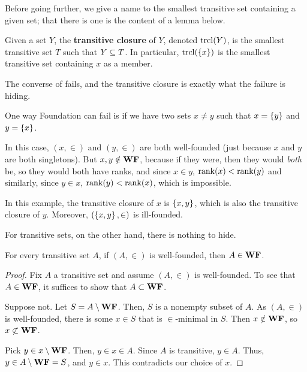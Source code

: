 Before going further, we give a name to the smallest transitive set containing a given set; that there is one is the content of a lemma below.

\begin{boxdefinition}
    Given a set $Y$, the \textbf{transitive closure} of $Y$, denoted $\operatorname{trcl}\!\left( Y \right)$, is the smallest transitive set $T$ such that $Y \subseteq T$. In particular, $\operatorname{trcl}\!\left( \left\{ x \right\} \right)$ is the smallest transitive set containing $x$ as a member.
\end{boxdefinition}

The converse of  fails, and the transitive closure is exactly what the failure is hiding.

\begin{boxnexample}
    One way Foundation can fail is if we have two sets $x \ne y$ such that $x = \left\{ y \right\}$ and $y = \left\{ x \right\}$.
    
    In this case, $(x, \in)$ and $(y, \in)$ are both well-founded (just because $x$ and $y$ are both singletons). But $x, y \notin \mathbf{WF}$, because if they were, then they would \textit{both} be, so they would both have ranks, and since $x \in y$, $\operatorname{rank}\!\left( x \right) < \operatorname{rank}\!\left( y \right)$ and similarly, since $y \in x$, $\operatorname{rank}\!\left( y \right) < \operatorname{rank}\!\left( x \right)$, which is impossible.

    In this example, the transitive closure of $x$ is $\left\{ x, y \right\}$, which is also the transitive closure of $y$. Moreover, $\left( \left\{ x, y \right\}, \in \right)$ is ill-founded.
\end{boxnexample}

For transitive sets, on the other hand, there is nothing to hide.

\begin{boxproposition}\label{Ch1:Prop:Transitive_WF}
    For every transitive set $A$, if $(A, \in)$ is well-founded, then $A \in \mathbf{WF}$.
\end{boxproposition}
\begin{proof}
    Fix $A$ a transitive set and assume $(A, \in)$ is well-founded. To see that $A \in \mathbf{WF}$, it suffices to show that $A \subset \mathbf{WF}$.

    Suppose not. Let $S = A \setminus \mathbf{WF}$. Then, $S$ is a nonempty subset of $A$. As $(A, \in)$ is well-founded, there is some $x \in S$ that is $\in$-minimal in $S$. Then $x \notin \mathbf{WF}$, so $x \not\subset \mathbf{WF}$.

    Pick $y \in x \setminus \mathbf{WF}$. Then, $y \in x \in A$. Since $A$ is transitive, $y \in A$. Thus, $y \in A \setminus \mathbf{WF} = S$, and $y \in x$. This contradicts our choice of $x$.
\end{proof}

